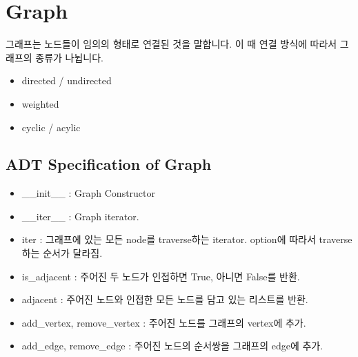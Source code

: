 \documentclass[titlepage]{report}
\begin{document}
\section{Graph} 

그래프는 노드들이 임의의 형태로 연결된 것을 말합니다. 이 때 연결 방식에 따라서 그래프의 종류가 나뉩니다. 

\begin{itemize} 
\item directed / undirected
\item weighted
\item cyclic / acylic
\end{itemize}

\subsection{ADT Specification of Graph} 

\begin{itemize} 
\item \_\_init\_\_ : Graph Constructor
\item \_\_iter\_\_ : Graph iterator. 
\item iter : 그래프에 있는 모든 node를 traverse하는 iterator. option에 따라서 traverse하는 순서가 달라짐. 
\item is\_adjacent : 주어진 두 노드가 인접하면 True, 아니면 False를 반환. 
\item adjacent : 주어진 노드와 인접한 모든 노드를 담고 있는 리스트를 반환. 
\item add\_vertex, remove\_vertex : 주어진 노드를 그래프의 vertex에 추가. 
\item add\_edge, remove\_edge : 주어진 노드의 순서쌍을 그래프의 edge에 추가. 
\end{itemize} 
%




\end{document}
